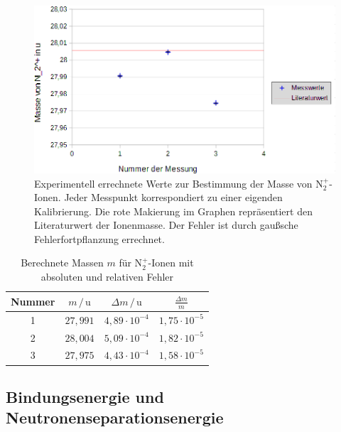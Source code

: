 \documentclass[numbers=noenddot,a4paper,notitlepage,twoside,BCOR15mm]{scrartcl}
\begin{document}
	\begin{figure}[!h]
		\centering
		\includegraphics[width = 1.0\textwidth]{pics/Masse}
		\caption{Experimentell errechnete Werte zur Bestimmung der Masse von N$_2^+$-Ionen. Jeder Messpunkt korrespondiert zu einer eigenden Kalibrierung. Die rote Makierung im Graphen repräsentiert den Literaturwert der Ionenmasse. Der Fehler ist durch gaußsche Fehlerfortpflanzung errechnet.}
		\label{abb:masse}
	\end{figure}
	
	
	\begin{table}[h]
		\centering
		\caption{Berechnete Massen $m$ für N$^+_2$-Ionen mit absoluten und relativen Fehler}
		\begin{tabular}{c|c c c} 
			
			Nummer & $m\,/\,\mathrm{u}$ & $\Delta m\,/\,\mathrm{u}$ & $\frac{\Delta m}{m}$ \\ \hline
			1 & $27,991$ & $4,89\cdot 10^{-4}$ & $1,75\cdot 10^{-5}$ \\
			2 & $28,004$ & $5,09\cdot 10^{-4}$ & $1,82\cdot 10^{-5}$ \\
			3 & $27,975$ & $4,43\cdot 10^{-4}$ & $1,58\cdot 10^{-5}$ 
		\end{tabular}
		\label{tab:masse}
	\end{table}
	\clearpage
	
	\subsection{Bindungsenergie und Neutronenseparationsenergie}
	
\end{document}
